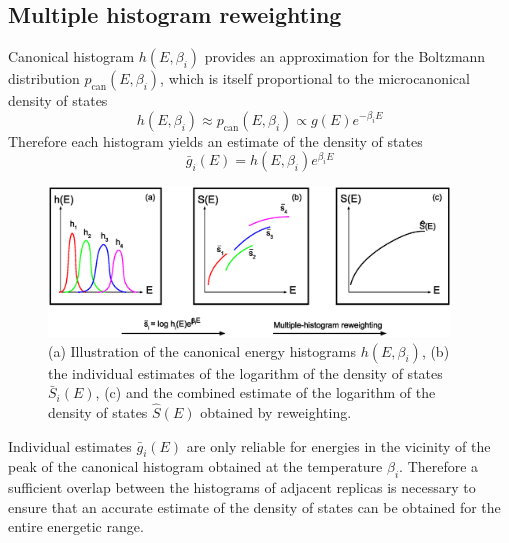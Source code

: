 \documentclass[12pt]{report}
\begin{document}
\subsection{Multiple histogram reweighting}
\label{subsec:MultipleHistogramRew}
Canonical histogram $h(E,\beta_{i})$ provides an approximation for the Boltzmann distribution $p_{\mathrm{can}}(E, \beta_{i})$, which is itself proportional to the microcanonical density of states
%
\begin{equation}
\label{eq:canonicalDistribution}
h(E,\beta_{i}) \approx p_{\mathrm{can}}(E, \beta_{i}) \propto g(E)e^{-\beta_{i}E}
\end{equation}
%
Therefore each histogram yields an estimate of the density of states 
%
\begin{equation}
\label{eq:singleHistogramReweighting}
\bar{g}_{i}(E) = h(E,\beta_{i})e^{\beta _{i} E}
\end{equation}
%
%
\begin{figure}
\center
\includegraphics[width = 0.95\textwidth]{chapter3Figs/multipleHistogramReweighting.eps}
\caption{\label{fig:MHR}%
(a) Illustration of the canonical energy histograms $h(E,\beta_{i})$, (b) the individual estimates of the logarithm of the density of states $\bar{S}_{i}(E)$, (c) and the combined estimate of the logarithm of the density of states $\hat{S}(E)$ obtained by reweighting.}
\end{figure}
% 
Individual estimates $\bar{g}_{i}(E)$ are only reliable for energies in the
vicinity of the peak of the canonical histogram obtained at the temperature
$\beta _{i}$. Therefore a sufficient overlap between the histograms of
adjacent replicas is necessary to ensure that an accurate estimate of the density of states can be obtained for the entire energetic range. 
\end{document}
